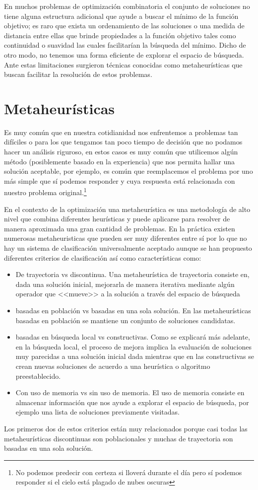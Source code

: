 En muchos problemas de optimización combinatoria el conjunto de soluciones no tiene alguna estructura adicional que ayude a buscar el mínimo de la función objetivo; es raro que exista un ordenamiento de las soluciones o una medida de distancia entre ellas que brinde propiedades a la función objetivo tales como continuidad o suavidad las cuales facilitarían la búsqueda del mínimo. Dicho de otro modo, no tenemos una forma eficiente de explorar el espacio de búsqueda. Ante estas limitaciones surgieron técnicas conocidas como metaheurísticas que buscan facilitar la resolución de estos problemas.

\section{Metaheurísticas}
Es muy común que en nuestra cotidianidad nos enfrentemos a problemas tan difíciles o para los que tengamos tan poco tiempo de decisión que no podamos hacer un análisis riguroso, en estos casos es muy común que utilicemos algún método (posiblemente basado en la experiencia) que nos permita hallar una solución aceptable, por ejemplo, es común que reemplacemos el problema por uno más simple que sí podemos responder y cuya respuesta está relacionada con nuestro problema original.\footnote{No podemos predecir con certeza si lloverá durante el día pero sí podemos responder si el cielo está plagado de nubes oscuras}  

En el contexto de la optimización una metaheurística es una metodología de alto nivel que combina diferentes heurísticas y puede aplicarse para resolver de manera aproximada una gran cantidad de problemas. En la práctica existen numerosas metaheuristicas que pueden ser muy diferentes entre sí por lo que no hay un sistema de clasificación universalmente aceptado aunque se han propuesto diferentes criterios de clasificación \cite{Stegherr2020} así como características como:
\begin{itemize}
\item De trayectoria vs discontinua. Una metaheurística de trayectoria consiste en, dada una solución inicial, mejorarla de manera iterativa mediante algún operador que <<mueve>> a la solución a través del espacio de búsqueda %
\item basadas en población vs basadas en una sola solución. En las metaheurísticas basadas en población se mantiene un conjunto de soluciones candidatas.
\item basadas en búsqueda local vs constructivas. Como se explicará más adelante, en la búsqueda local, el proceso de mejora implica la evaluación de soluciones muy parecidas a una solución inicial dada mientras que en las constructivas se crean nuevas soluciones de acuerdo a una heurística o algoritmo preestablecido.
\item Con uso de memoria vs sin uso de memoria. El uso de memoria consiste en almacenar información que nos ayude a explorar el espacio de búsqueda, por ejemplo una lista de soluciones previamente visitadas.
\end{itemize} 
Los primeros dos de estos criterios están muy relacionados porque casi todas las metaheurísticas discontinuas son poblacionales y muchas de trayectoria son basadas en una sola solución.


